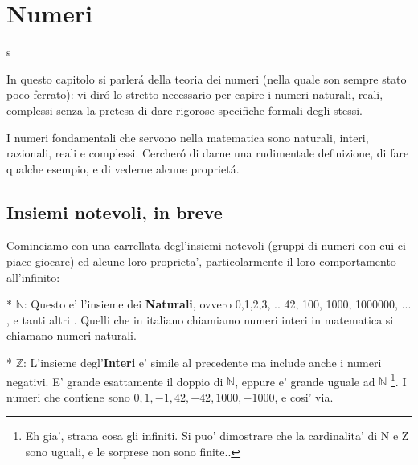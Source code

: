 \chapter{Numeri}
\label{numeri}



s%

In questo capitolo si parler\'a della teoria dei numeri (nella quale son sempre stato poco ferrato): vi dir\'o lo stretto necessario per capire i numeri naturali,
reali, complessi senza la pretesa di dare rigorose specifiche formali degli stessi.

I numeri fondamentali che servono nella matematica sono naturali, interi, razionali, reali e complessi. Cercher\'o di darne una rudimentale definizione,
di fare qualche esempio, e di vederne alcune propriet\'a.

\section{Insiemi notevoli, in breve}

Cominciamo con una carrellata degl'insiemi notevoli (gruppi di numeri con cui ci piace giocare) ed alcune loro proprieta', particolarmente il loro comportamento all'infinito:

* $\mathbb{N}$: Questo e' l'insieme dei \textbf{Naturali}, ovvero {0,1,2,3, .. 42, 100, 1000, 1000000, ... , e tanti altri }. Quelli che in
  italiano chiamiamo numeri interi in matematica si chiamano numeri naturali.

* $\mathbb{Z}$: L'insieme degl'\textbf{Interi} e' simile al precedente ma include anche i numeri negativi. 
 E' grande esattamente il doppio di $\mathbb{N}$, eppure e' grande uguale ad $\mathbb{N}$ \footnote{Eh gia', strana cosa gli infiniti. Si puo' dimostrare che la cardinalita' di N e Z sono uguali, e le sorprese non sono finite.. }.
 I numeri che contiene sono $0,1,-1,42,-42,1000,-1000$, e cosi' via.

